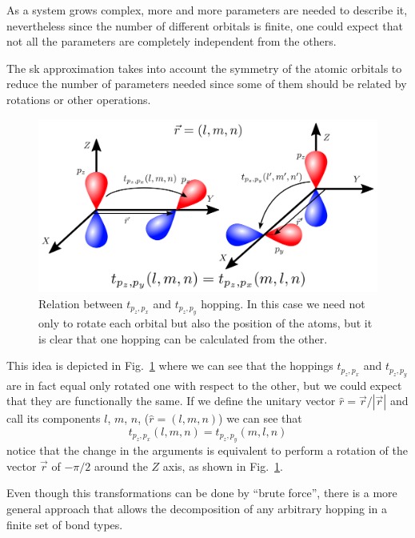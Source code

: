 As a system grows complex, more and more parameters are needed to describe it, nevertheless since the number of different orbitals is finite, one could expect that not all the parameters are completely independent from the others.


The \ac{sk} approximation takes into account the symmetry of the atomic orbitals to reduce the number of parameters needed since some of them should be related by rotations or other operations.
\begin{figure}[h!]
\centering
\includegraphics{chapter04/figures/complex.png}
\vspace{-5pt}
\caption{Relation between $t_{p_{z},p_{x}}$ and $t_{p_{z},p_{y}}$ hopping. In this case we need not only to rotate each orbital but also the position of the atoms, but it is clear that one hopping can be calculated from the other.}
\label{complex}
\end{figure}
\FloatBarrier
This idea is depicted in Fig.~\ref{complex} where we can see that the hoppings $t_{p_{z},p_{x}}$ and $t_{p_{z},p_{y}}$ are in fact equal only rotated one with respect to the other, but we could expect that they are functionally the same.
If we define the unitary vector $\hat{r} = \vec{r}/|\vec{r}|$ and call its components $l$, $m$, $n$, ($\hat{r}=(l,m,n)$) we can see that
\begin{equation}
  t_{p_{z},p_{x}} (l,m,n) = t_{p_{z},p_{y}}(m,l,n)
\end{equation}
notice that the change in the arguments is equivalent to perform a rotation of the vector $\vec{r}$ of $-\pi/2$ around the $Z$ axis, as shown in Fig.~\ref{complex}.


Even though  this transformations can be done by ``brute force'', there is a more general approach that allows the decomposition of any arbitrary hopping in a finite set of bond types.

